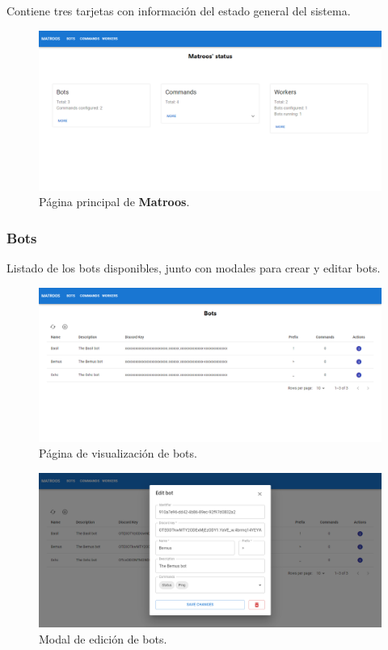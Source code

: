 Contiene tres tarjetas con información del estado general del sistema.

\begin{figure}[H]
	\centering
	\includegraphics[width=1\textwidth]{img/front/page-home.png}
	\caption{Página principal de \textbf{Matroos}.}
\end{figure}

\subsubsection{Bots}

Listado de los bots disponibles, junto con modales para crear y editar bots.

\begin{figure}[H]
	\centering
	\includegraphics[width=1\textwidth]{img/front/page-bots.png}
	\caption{Página de visualización de bots.}
\end{figure}

\begin{figure}[H]
	\centering
	\includegraphics[width=1\textwidth]{img/front/page-bots-edit.png}
	\caption{Modal de edición de bots.}
\end{figure}

